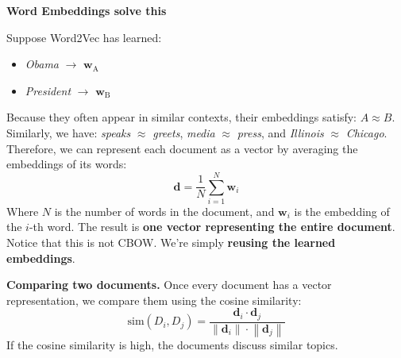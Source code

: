 \highspace
\begin{flushleft}
    \textcolor{Green3}{ \textbf{Word Embeddings solve this}}
\end{flushleft}
Suppose Word2Vec has learned:
\begin{itemize}
    \item \emph{Obama} $\rightarrow$ $\mathbf{w}_{\text{A}}$
    \item \emph{President} $\rightarrow$ $\mathbf{w}_{\text{B}}$
\end{itemize}
Because they often appear in similar contexts, their embeddings satisfy: $A \approx B$. Similarly, we have: \emph{speaks} $\approx$ \emph{greets}, \emph{media} $\approx$ \emph{press}, and \emph{Illinois} $\approx$ \emph{Chicago}. Therefore, we can represent each document as a vector by averaging the embeddings of its words:
\begin{equation}
    \mathbf{d} = \frac{1}{N} \sum_{i=1}^{N} \mathbf{w}_{i}
\end{equation}
Where $N$ is the number of words in the document, and $\mathbf{w}_{i}$ is the embedding of the $i$-th word. The result is \textbf{one vector representing the entire document}. Notice that this is not CBOW. We're simply \textbf{reusing the learned embeddings}.

\highspace
\textcolor{DarkOrange3}{ \textbf{Comparing two documents.}} Once every document has a vector representation, we compare them using the cosine similarity:
\begin{equation*}
    \mathrm{sim}\left(D_i, D_j\right) = \frac{\mathbf{d}_i \cdot \mathbf{d}_j}{\left\|\mathbf{d}_i\right\| \cdot \left\|\mathbf{d}_j\right\|} 
\end{equation*}
If the cosine similarity is high, the documents discuss similar topics.

